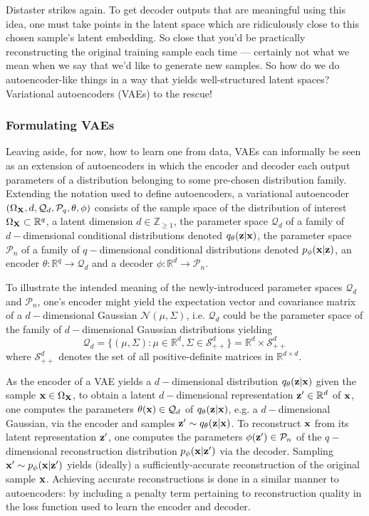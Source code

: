 \documentclass[11pt]{article}
\begin{document}
Distaster strikes again. To get decoder outputs that are meaningful using this idea, one must take points in the latent space which are ridiculously close to this chosen sample's latent embedding. So close that you'd be practically reconstructing the original training sample each time — certainly not what we mean when we say that we'd like to generate new samples. So how do we do autoencoder-like things in a way that yields well-structured latent spaces? Variational autoencoders (VAEs) to the rescue!

\subsubsection{Formulating VAEs}
Leaving aside, for now, how to learn one from data, VAEs can informally be seen as an extension of autoencoders in which the encoder and decoder each output parameters of a distribution belonging to some pre-chosen distribution family. Extending the notation used to define autoencoders, a variational autoencoder $(\Omega_{\mathbf{X}},d,\mathcal{Q}_d,\mathcal{P}_q,\theta,\phi)$ consists of the sample space of the distribution of interest $\Omega_{\mathbf{X}}\subset\mathbb{R}^q$, a latent dimension $d\in\mathbb{Z}_{\geq1}$, the parameter space $\mathcal{Q}_d$ of a family of $d-$dimensional conditional distributions denoted $q_{\theta}(\mathbf{z}|\mathbf{x})$, the parameter space $\mathcal{P}_n$ of a family of $q-$dimensional conditional distributions denoted $p_{\phi}(\mathbf{x}|\mathbf{z})$, an encoder $\theta:\mathbb{R}^q\to\mathcal{Q}_d$ and a decoder $\phi:\mathbb{R}^d\to\mathcal{P}_n$.

To illustrate the intended meaning of the newly-introduced parameter spaces $\mathcal{Q}_d$ and $\mathcal{P}_n$, one's encoder might yield the expectation vector and covariance matrix of a $d-$dimensional Gaussian $\mathcal{N}(\mu,\Sigma)$, i.e. $\mathcal{Q}_d$ could be the parameter space of the family of $d-$dimensional Gaussian distributions yielding
$$
\mathcal{Q}_d
=
\{
(\mu,\Sigma):\mu\in\mathbb{R}^d, \Sigma\in\mathcal{S}_{++}^d
\}
=
\mathbb{R}^d\times\mathcal{S}_{++}^d
$$
where $\mathcal{S}_{++}^d$ denotes the set of all positive-definite matrices in $\mathbb{R}^{d\times d}$.

As the encoder of a VAE yields a $d-$dimensional distribution $q_{\theta}(\mathbf{z}|\mathbf{x})$ given the sample $\mathbf{x}\in\Omega_{\mathbf{X}}$, to obtain a latent $d-$dimensional representation $\mathbf{z}'\in\mathbb{R}^d$ of $\mathbf{x}$, one computes the parameters $\theta(\mathbf{x})\in\mathcal{Q}_d$ of $q_{\theta}(\mathbf{z}|\mathbf{x})$, e.g. a $d-$dimensional Gaussian, via the encoder and samples $\mathbf{z}'\sim q_{\theta}(\mathbf{z}|\mathbf{x})$. To reconstruct $\mathbf{x}$ from its latent representation $\mathbf{z}'$, one computes the parameters $\phi(\mathbf{z}')\in\mathcal{P}_n$ of the $q-$dimensional reconstruction distribution $p_{\phi}(\mathbf{x}|\mathbf{z}')$ via the decoder. Sampling $\mathbf{x}'\sim p_{\phi}(\mathbf{x}|\mathbf{z}')$ yields (ideally) a sufficiently-accurate reconstruction of the original sample $\mathbf{x}$. Achieving accurate reconstructions is done in a similar manner to autoencoders: by including a penalty term pertaining to reconstruction quality in the loss function used to learn the encoder and decoder.
\end{document}
